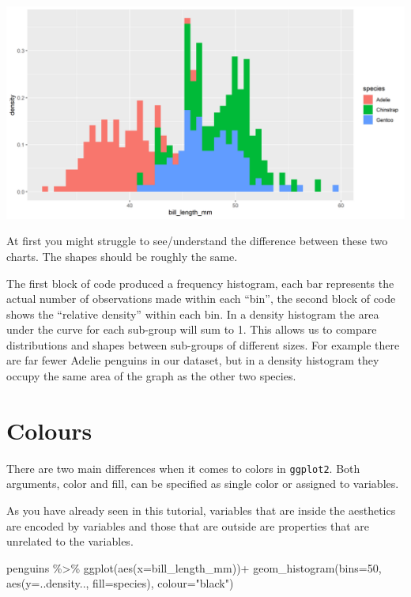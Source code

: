 \documentclass[
]{book}
\newenvironment{Shaded}{\begin{snugshade}}{\end{snugshade}}
\newcommand{\AttributeTok}[1]{\textcolor[rgb]{0.77,0.63,0.00}{#1}}
\newcommand{\DecValTok}[1]{\textcolor[rgb]{0.00,0.00,0.81}{#1}}
\newcommand{\FunctionTok}[1]{\textcolor[rgb]{0.00,0.00,0.00}{#1}}
\newcommand{\NormalTok}[1]{#1}
\newcommand{\SpecialCharTok}[1]{\textcolor[rgb]{0.00,0.00,0.00}{#1}}
\newcommand{\StringTok}[1]{\textcolor[rgb]{0.31,0.60,0.02}{#1}}
\begin{document}
\includegraphics[width=0.8\linewidth]{images/density}

At first you might struggle to see/understand the difference between these two charts. The shapes should be roughly the same.

The first block of code produced a frequency histogram, each bar represents the actual number of observations made within each ``bin'', the second block of code shows the ``relative density'' within each bin. In a density histogram the area under the curve for each sub-group will sum to 1. This allows us to compare distributions and shapes between sub-groups of different sizes. For example there are far fewer Adelie penguins in our dataset, but in a density histogram they occupy the same area of the graph as the other two species.

\hypertarget{colours}{%
\section{Colours}\label{colours}}

There are two main differences when it comes to colors in \texttt{ggplot2}. Both arguments, color and fill, can be specified as single color or
assigned to variables.

As you have already seen in this tutorial, variables that are inside the aesthetics are encoded by variables and those that are outside are properties that are unrelated to the variables.

\begin{Shaded}
\begin{Highlighting}[]
\NormalTok{penguins }\SpecialCharTok{\%\textgreater{}\%} 
    \FunctionTok{ggplot}\NormalTok{(}\FunctionTok{aes}\NormalTok{(}\AttributeTok{x=}\NormalTok{bill\_length\_mm))}\SpecialCharTok{+}
    \FunctionTok{geom\_histogram}\NormalTok{(}\AttributeTok{bins=}\DecValTok{50}\NormalTok{, }
                   \FunctionTok{aes}\NormalTok{(}\AttributeTok{y=}\NormalTok{..density..,}
                       \AttributeTok{fill=}\NormalTok{species), }
                   \AttributeTok{colour=}\StringTok{"black"}\NormalTok{)}
\end{Highlighting}
\end{Shaded}
\end{document}
